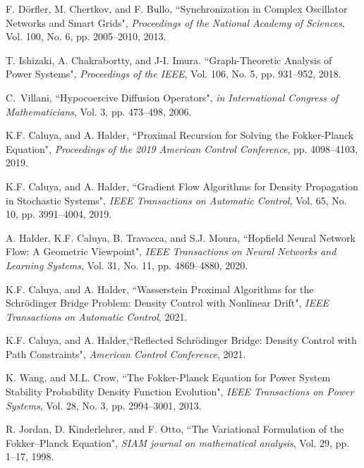 \documentclass[10pt,twocolumn]{IEEEtran}
\begin{document}
\begin{thebibliography}{99}
F. D{\"o}rfler, M. Chertkov, and F. Bullo, ``Synchronization in Complex Oscillator Networks and Smart Grids", \emph{Proceedings of the National Academy of Sciences}, Vol. 100, No. 6, pp. 2005--2010, 2013.

T. Ishizaki, A. Chakrabortty, and J-I. Imura. ``Graph-Theoretic Analysis of Power Systems", \emph{Proceedings of the IEEE}, Vol. 106, No. 5, pp. 931--952, 2018.

C.~Villani, ``Hypocoercive Diffusion Operators", \emph{in International Congress
of Mathematicians}, Vol. 3, pp. 473--498, 2006.


K.F. Caluya, and A. Halder, ``Proximal Recursion for Solving the Fokker-Planck Equation", \emph{Proceedings of the 2019 American Control Conference}, pp. 4098--4103, 2019.

K.F. Caluya, and A. Halder, ``Gradient Flow Algorithms for Density Propagation in Stochastic Systems", \emph{IEEE Transactions on Automatic Control}, Vol. 65, No. 10, pp. 3991--4004, 2019.

A. Halder, K.F. Caluya, B. Travacca, and S.J. Moura, ``Hopfield Neural Network Flow: A Geometric Viewpoint", \emph{IEEE Transactions on Neural Networks and Learning Systems}, Vol. 31, No. 11, pp. 4869--4880, 2020. 


K.F. Caluya, and A. Halder, ``Wasserstein Proximal Algorithms for the Schr\"{o}dinger Bridge Problem: Density Control with Nonlinear Drift", \emph{IEEE Transactions on Automatic Control}, 2021.

K.F. Caluya, and A. Halder,``Reflected Schr\"{o}dinger Bridge: Density Control with Path Constraints", \emph{American Control Conference}, 2021.



K. Wang, and M.L. Crow, ``The Fokker-Planck Equation for Power System Stability Probability Density Function Evolution", \emph{IEEE Transactions on Power Systems}, Vol. 28, No. 3, pp. 2994--3001, 2013.


R. Jordan, D. Kinderlehrer, and F. Otto, ``The Variational Formulation of the Fokker--Planck Equation", \emph{SIAM journal on mathematical analysis}, Vol. 29, pp. 1--17, 1998.


\end{thebibliography}
\end{document}
